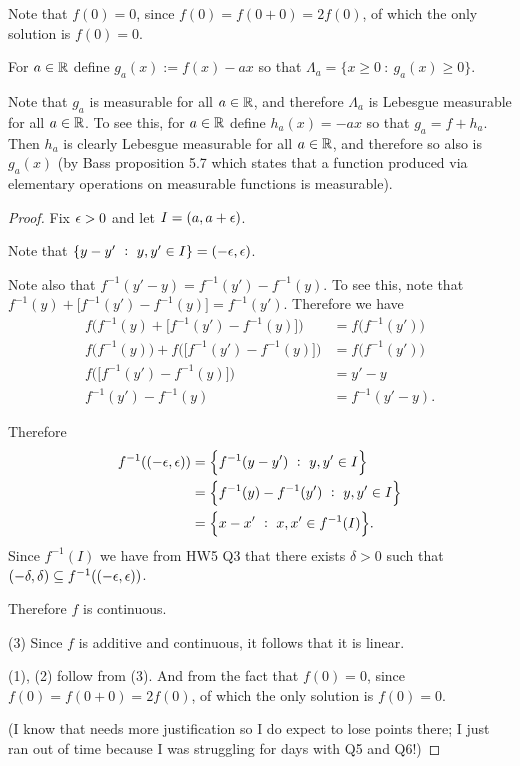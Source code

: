 Note that $f(0) = 0$, since $f(0) = f(0 + 0) = 2f(0)$, of which the only solution is $f(0) = 0$.

For $a \in \mathbb{R}$ define $g_a(x) := f(x) - ax$ so that $\Lambda_a = \{x \geq 0 ~:~ g_a(x) \geq 0\}$.

Note that $g_a$ is measurable for all $a \in \mathbb{R}$, and therefore $\Lambda_a$ is Lebesgue measurable for
all $a \in \mathbb{R}$. To see this, for $a \in \mathbb{R}$ define $h_a(x) = -ax$ so that $g_a = f + h_a$. Then $h_a$ is
clearly Lebesgue measurable for all $a \in \mathbb{R}$, and therefore so also is $g_a(x)$ (by Bass proposition 5.7
which states that a function produced via elementary operations on measurable functions is measurable).

\begin{proof}
  Fix $\epsilon > 0$ and let $I = (a, a + \epsilon)$.

  Note that $\{y - y' ~:~ y, y' \in I\} = (-\epsilon, \epsilon)$.

  Note also that $f^{-1}(y' - y) = f^{-1}(y') - f^{-1}(y)$. To see this, note
  that $f^{-1}(y) + \big[f^{-1}(y') - f^{-1}(y)\big] = f^{-1}(y')$. Therefore we have
  \begin{align*}
    f\Big(f^{-1}(y) + \big[f^{-1}(y') - f^{-1}(y)\big]\Big) &= f\big(f^{-1}(y')\big) \\
    f\Big(f^{-1}(y)\Big) + f\Big(\big[f^{-1}(y') - f^{-1}(y)\big]\Big) &= f\big(f^{-1}(y')\big) \\
    f\Big(\big[f^{-1}(y') - f^{-1}(y)\big]\Big) &= y' - y \\
    f^{-1}(y') - f^{-1}(y) &= f^{-1}(y' - y).
  \end{align*}

  Therefore
  \begin{align*}
    f^{-1}((-\epsilon, \epsilon))
    &= \Big\{f^{-1}(y - y') ~:~ y, y' \in I\Big\} \\
    &= \Big\{f^{-1}(y) - f^{-1}(y') ~:~ y, y' \in I\Big\} \\
    &= \Big\{x - x' ~:~ x, x' \in f^{-1}(I)\Big\}.
  \end{align*}
  Since $f^{-1}(I)$ we have from HW5 Q3 that there exists $\delta > 0$ such
  that $(-\delta, \delta) \subseteq f^{-1}((-\epsilon, \epsilon))$.

  Therefore $f$ is continuous.

  (3) Since $f$ is additive and continuous, it follows that it is linear.

  (1), (2) follow from (3). And from the fact that $f(0) = 0$, since $f(0) = f(0 + 0) = 2f(0)$, of which the only solution is $f(0) = 0$.

  (I know that needs more justification so I do expect to lose points there; I just ran out of time because I
  was struggling for days with Q5 and Q6!)
\end{proof}




